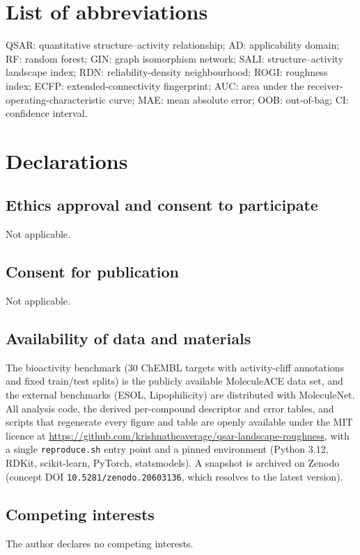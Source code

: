 \documentclass[11pt,letterpaper]{article}
\begin{document}
\section*{List of abbreviations}
QSAR: quantitative structure--activity relationship; AD: applicability domain; RF: random forest; GIN: graph isomorphism network; SALI: structure--activity landscape index; RDN: reliability-density neighbourhood; ROGI: roughness index; ECFP: extended-connectivity fingerprint; AUC: area under the receiver-operating-characteristic curve; MAE: mean absolute error; OOB: out-of-bag; CI: confidence interval.

\section*{Declarations}

\subsection*{Ethics approval and consent to participate}
Not applicable.

\subsection*{Consent for publication}
Not applicable.

\subsection*{Availability of data and materials}
The bioactivity benchmark (30 ChEMBL targets with activity-cliff annotations and fixed train/test splits) is the publicly available MoleculeACE data set,\cite{vantilborg2022} and the external benchmarks (ESOL, Lipophilicity) are distributed with MoleculeNet.\cite{delaney2004,wu2018} All analysis code, the derived per-compound descriptor and error tables, and scripts that regenerate every figure and table are openly available under the MIT licence at \url{https://github.com/krishnatheaverage/qsar-landscape-roughness}, with a single \texttt{reproduce.sh} entry point and a pinned environment (Python 3.12, RDKit, scikit-learn, PyTorch, statsmodels). A snapshot is archived on Zenodo (concept DOI \texttt{10.5281/zenodo.20603136}, which resolves to the latest version).

\subsection*{Competing interests}
The author declares no competing interests.
\end{document}
